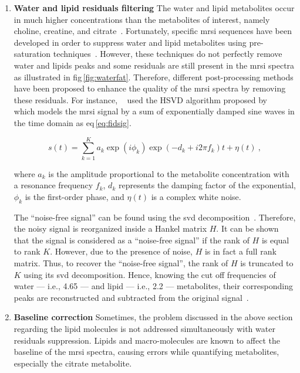 \begin{enumerate}[leftmargin=*]
\item[] \textbf{Water and lipid residuals filtering}
The water and lipid metabolites occur in much higher concentrations than the
metabolites of interest, namely choline, creatine, and
citrate~\cite{Zhu2010,Osorio-Garcia2012}.
Fortunately, specific \ac{mrsi} sequences have been developed in order to
suppress water and lipid metabolites using pre-saturation
techniques~\cite{Zhu2010}.
However, these techniques do not perfectly remove water and lipids peaks and
some residuals are still present in the \ac{mrsi} spectra as illustrated in
\ac{fig}\,\ref{fig:waterfat}.
Therefore, different post-processing methods have been proposed to enhance the
quality of the \ac{mrsi} spectra by removing these residuals.
For instance, \citeauthor{Kelm2007}~\cite{Kelm2007} used the HSVD algorithm
proposed by \citeauthor{Pijnappel1992}~\cite{Pijnappel1992} which models the
\ac{mrsi} signal by a sum of exponentially damped sine waves in the time domain
as \acs{eq}\,\eqref{eq:fidsig}.

\begin{equation}
  s(t) = \sum_{k=1}^{K} a_{k}\exp(i \phi_k) \exp( -d_{k} + i 2 \pi f_{k} ) t +
  \eta(t) \ ,
  \label{eq:fidsig}
\end{equation}

\noindent where $a_k$ is the amplitude proportional to the metabolite
concentration with a resonance frequency $f_{k}$, $d_k$ represents the damping
factor of the exponential, $\phi_k$ is the first-order phase, and $\eta(t)$ is
a complex white noise.

The ``noise-free signal'' can be found using the \ac{svd}
decomposition~\cite{Pijnappel1992}.
Therefore, the noisy signal is reorganized inside a Hankel matrix $H$.
It can be shown that the signal is considered as a ``noise-free signal'' if the
rank of $H$ is equal to rank $K$.
However, due to the presence of noise, $H$ is in fact a full rank matrix.
Thus, to recover the ``noise-free signal'', the rank of $H$ is truncated to $K$
using its \ac{svd} decomposition.
Hence, knowing the cut off frequencies of water --- i.e., \SI{4.65}{\ppm} ---
and lipid --- i.e., \SI{2.2}{\ppm} --- metabolites, their corresponding peaks
are reconstructed and subtracted from the original signal~\cite{Laudadio2002}.

\item[] \textbf{Baseline correction}
Sometimes, the problem discussed in the above section regarding the lipid
molecules is not addressed simultaneously with water residuals suppression.
Lipids and macro-molecules are known to affect the baseline of the \ac{mrsi}
spectra, causing errors while quantifying metabolites, especially the citrate
metabolite.


\end{enumerate}
